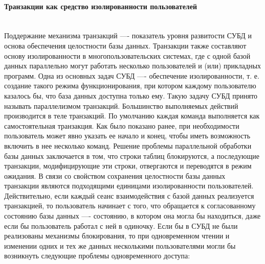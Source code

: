 \paragraph{Транзакции как средство изолированности пользователей} ~\\

Поддержание механизма транзакций —- показатель уровня развитости СУБД
и основа обеспечения целостности базы данных. Транзакции также составляют основу изолированности в многопользовательских системах, где с одной базой данных параллельно могут работать несколько пользователей
и (или) прикладных программ. Одна из основных задач СУБД —- обеспечение изолированности, т. е. создание такого режима функционирования, при
котором каждому пользователю казалось бы, что база данных доступна только ему. Такую задачу СУБД принято называть параллелизмом транзакций.
Большинство выполняемых действий производится в теле транзакций. По
умолчанию каждая команда выполняется как самостоятельная транзакция.
Как было показано ранее, при необходимости пользователь может явно указать ее начало и конец, чтобы иметь возможность включить в нее несколько
команд.
Решение проблемы параллельной обработки базы данных заключается в том,
что строки таблиц блокируются, а последующие транзакции, модифицирующие эти строки, отвергаются и переводятся в режим ожидания. В связи со
свойством сохранения целостности базы данных транзакции являются подходящими единицами изолированности пользователей. Действительно, если
каждый сеанс взаимодействия с базой данных реализуется транзакцией, то
пользователь начинает с того, что обращается к согласованному состоянию
базы данных —- состоянию, в котором она могла бы находиться, даже если
бы пользователь работал с ней в одиночку.
Если бы в СУБД не были реализованы механизмы блокирования, то при
одновременном чтении и изменении одних и тех же данных несколькими
пользователями могли бы возникнуть следующие проблемы одновременного доступа:
